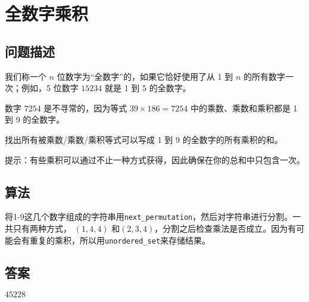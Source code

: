 \section{全数字乘积}
\subsection{问题描述}
\begin{tcolorbox}
	我们称一个 $n$ 位数字为“全数字”的，如果它恰好使用了从 1 到 $n$ 的所有数字一次；例如，5 位数字 $15234$ 就是 1 到 5 的全数字。

	数字 $7254$ 是不寻常的，因为等式 $39 \times 186 = 7254$ 中的乘数、乘数和乘积都是 1 到 9 的全数字。

	找出所有被乘数/乘数/乘积等式可以写成 1 到 9 的全数字的所有乘积的和。

	提示：有些乘积可以通过不止一种方式获得，因此确保在你的总和中只包含一次。
\end{tcolorbox}

\subsection{算法}
将1-9这几个数字组成的字符串用\texttt{next\_permutation}，然后对字符串进行分割。一共只有两种方式， \( (1,4,4)\) 和\( (2,3,4)
\)，分割之后检查乘法是否成立。因为有可能会有重复的乘积，所以用\texttt{unordered\_set}来存储结果。

\subsection{答案}
$45228$
